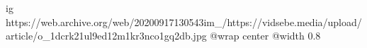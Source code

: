  
 
 
 
 

\ifcmt
  ig https://web.archive.org/web/20200917130543im_/https://vidsebe.media/upload/article/o_1dcrk21ul9ed12m1kr3nco1gq2db.jpg
  @wrap center
  @width 0.8
\fi
